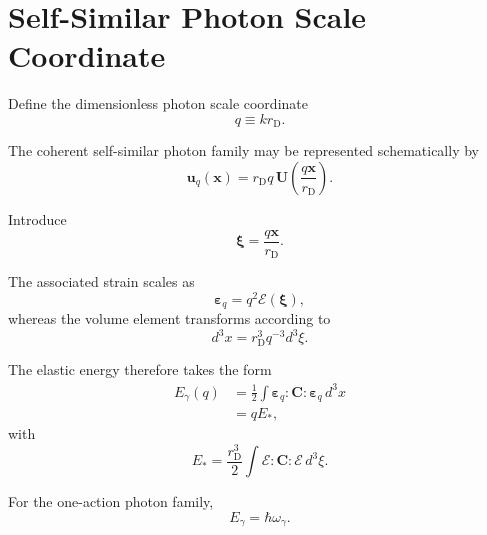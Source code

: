 \section{Self-Similar Photon Scale Coordinate}

Define the dimensionless photon scale coordinate
\begin{equation}
    q
    \equiv
    kr_{\mathrm D}.
    \label{eq:AQ_qdef}
\end{equation}

The coherent self-similar photon family may be represented schematically by
\begin{equation}
    \mathbf{u}_q(\mathbf{x})
    =
    r_{\mathrm D}q\,
    \mathbf{U}
    \left(
        \frac{q\mathbf{x}}{r_{\mathrm D}}
    \right).
    \label{eq:AQ_selfsimilar_photon}
\end{equation}

Introduce
\begin{equation}
    \boldsymbol{\xi}
    =
    \frac{q\mathbf{x}}{r_{\mathrm D}}.
\end{equation}

The associated strain scales as
\begin{equation}
    \boldsymbol{\varepsilon}_q
    =
    q^2
    \boldsymbol{\mathcal E}(\boldsymbol{\xi}),
\end{equation}
whereas the volume element transforms according to
\begin{equation}
    d^3x
    =
    r_{\mathrm D}^{3}
    q^{-3}
    d^3\xi.
\end{equation}

The elastic energy therefore takes the form
\begin{align}
    E_{\gamma}(q)
    &=
    \frac{1}{2}
    \int
    \boldsymbol{\varepsilon}_q
    :
    \mathbf{C}
    :
    \boldsymbol{\varepsilon}_q
    \,d^3x
    \\
    &=
    qE_*,
    \label{eq:AQ_Elinearq}
\end{align}
with
\begin{equation}
    E_*
    =
    \frac{r_{\mathrm D}^{3}}{2}
    \int
    \boldsymbol{\mathcal E}
    :
    \mathbf{C}
    :
    \boldsymbol{\mathcal E}
    \,d^3\xi.
\end{equation}

For the one-action photon family,
\begin{equation}
    E_{\gamma}
    =
    \hbar\omega_{\gamma}.
    \label{eq:AQ_Ehbaromega}
\end{equation}

